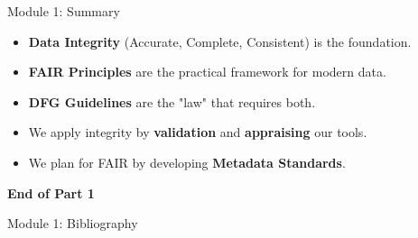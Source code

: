 \begin{frame}{Module 1: Summary}
    \begin{itemize}
        \item \textbf{Data Integrity} (Accurate, Complete, Consistent) is the foundation.
        \item \textbf{FAIR Principles} are the practical framework for modern data.
        \item \textbf{DFG Guidelines} are the "law" that requires both.
        \item We apply integrity by \textbf{validation} and \textbf{appraising} our tools.
        \item We plan for FAIR by developing \textbf{Metadata Standards}.
    \end{itemize}
    \vfill
    \begin{center}
        \textbf{End of Part 1}
    \end{center}
\end{frame}

\begin{frame}{Module 1: Bibliography}
    \printbibliography
\end{frame}